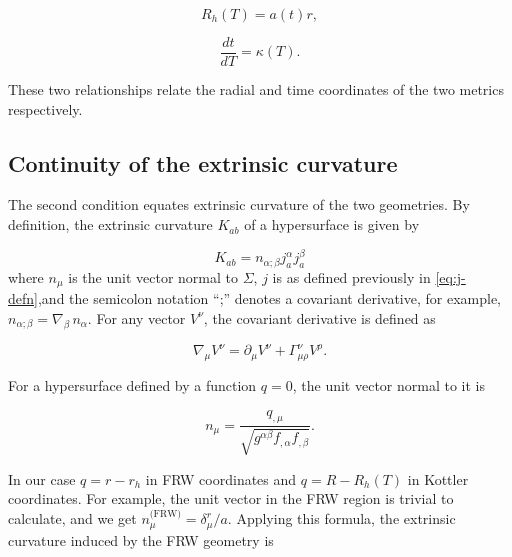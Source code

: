 \begin{equation}
  R_h(T) = a(t)r
  \label{eq:r-to-ar},
\end{equation}

\begin{equation}
  \frac{dt}{dT} = \kappa(T).
  \label{eq:dt-dT}
\end{equation}


These two relationships relate the radial and time coordinates of the two metrics respectively. 

\subsection{Continuity of the extrinsic curvature}

The second condition equates extrinsic curvature of the two geometries. By definition, the extrinsic curvature $K_{ab}$ of a hypersurface is given by

\begin{equation}
  K_{ab} = n_{\alpha;\beta} j^{\alpha}_{a} j^{\beta}_{a}
  \label{eq:extrinsic-curvature-defn}
\end{equation}
where $n_{\mu}$ is the unit vector normal to $\Sigma$, $j$ is as defined previously in \autoref{eq:j-defn},and the semicolon notation ``;'' denotes a covariant derivative, for example, $n_{\alpha;\beta} = \nabla_{\beta}\, n_{\alpha}$. For any vector $V^{\nu}$, the covariant derivative is defined as

\begin{equation}
  \nabla_{\mu}V^{\nu} = \partial_{\mu}V^{\nu} + \Gamma^{\nu}_{\mu \rho} V^{\rho}.
  \label{eq:covariant-derivative-defn}
\end{equation}

For a hypersurface defined by a function $q = 0$, the unit vector normal to it is

\begin{equation}
  n_{\mu} = \frac{q_{,\mu}}{\sqrt{g^{\alpha \beta} f_{,\alpha} f_{,\beta}}}.
  \label{eq:unit-normal-vector}
\end{equation}

In our case $q = r-r_h$ in FRW coordinates and $q = R - R_h(T)$ in Kottler coordinates. For example, the unit vector in the FRW region is trivial to calculate, and we get $n_{\mu}^{\text{(FRW)}} = \delta^r_{\mu}/a$. Applying this formula, the extrinsic curvature induced by the FRW geometry is


